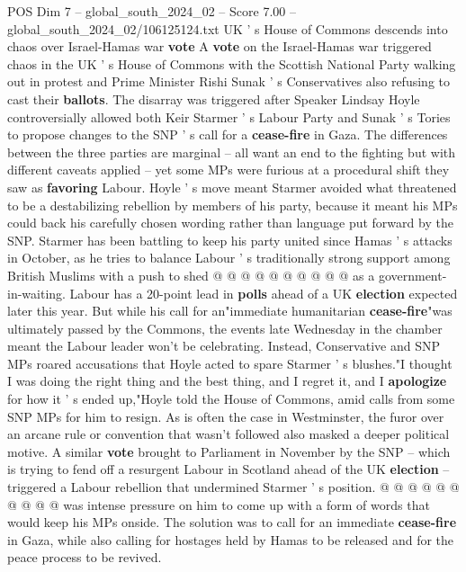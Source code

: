 \begin{textsample}{POS Dim 7 – global\_south\_2024\_02 – Score 7.00 – global\_south\_2024\_02/106125124.txt}  \label{ex:f7_pos_199}
UK ' s House of Commons descends into chaos over Israel-Hamas war \textbf{vote} A \textbf{vote} on the Israel-Hamas war triggered chaos in the UK ' s House of Commons with the Scottish National Party walking out in protest and Prime Minister Rishi Sunak ' s Conservatives also refusing to cast their \textbf{ballots}.
The disarray was triggered after Speaker Lindsay Hoyle controversially allowed both Keir Starmer ' s Labour Party and Sunak ' s Tories to propose changes to the SNP ' s call for a \textbf{cease-fire} in Gaza.
The differences between the three parties are marginal -- all want an end to the fighting but with different caveats applied -- yet some MPs were furious at a procedural shift they saw as \textbf{favoring} Labour.
Hoyle ' s move meant Starmer avoided what threatened to be a destabilizing rebellion by members of his party, because it meant his MPs could back his carefully chosen wording rather than language put forward by the SNP.
Starmer has been battling to keep his party united since Hamas ' s attacks in October, as he tries to balance Labour ' s traditionally strong support among British Muslims with a push to shed @ @ @ @ @ @ @ @ @ @ as a government-in-waiting.
Labour has a 20-point lead in \textbf{polls} ahead of a UK \textbf{election} expected later this year.
But while his call for an"immediate humanitarian \textbf{cease-fire}"was ultimately passed by the Commons, the events late Wednesday in the chamber meant the Labour leader won't be celebrating.
Instead, Conservative and SNP MPs roared accusations that Hoyle acted to spare Starmer ' s blushes."I thought I was doing the right thing and the best thing, and I regret it, and I \textbf{apologize} for how it ' s ended up,"Hoyle told the House of Commons, amid calls from some SNP MPs for him to resign.
As is often the case in Westminster, the furor over an arcane rule or convention that wasn't followed also masked a deeper political motive.
A similar \textbf{vote} brought to Parliament in November by the SNP -- which is trying to fend off a resurgent Labour in Scotland ahead of the UK \textbf{election} -- triggered a Labour rebellion that undermined Starmer ' s position. @ @ @ @ @ @ @ @ @ @ was intense pressure on him to come up with a form of words that would keep his MPs onside.
The solution was to call for an immediate \textbf{cease-fire} in Gaza, while also calling for hostages held by Hamas to be released and for the peace process to be revived.

\end{textsample}
